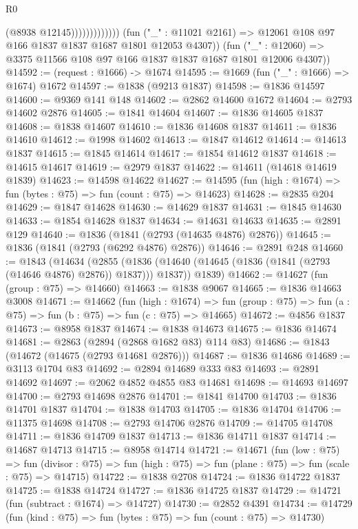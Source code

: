 \begin{lexlean}{R0}
\begin{coremodule}
                                (@8938 @12145)))))))))))))
        (fun ("_" : @11021 @2161) => @12061 @108 @97 @166 @1837 @1837 @1687 @1801 @12053 @4307))
      (fun ("_" : @12060) => @3375 @11566 @108 @97 @166 @1837 @1837 @1687 @1801 @12006 @4307))
@14592 := (request : @1666) -> @1674
@14595 := @1669 (fun ("_" : @1666) => @1674) @1672
@14597 := @1838 (@9213 @1837)
@14598 := @1836 @14597
@14600 := @9369 @141 @148
@14602 := @2862 @14600 @1672
@14604 := @2793 @14602 @2876
@14605 := @1841 @14604
@14607 := @1836 @14605 @1837
@14608 := @1838 @14607
@14610 := @1836 @14608 @1837
@14611 := @1836 @14610
@14612 := @1998 @14602
@14613 := @1847 @14612
@14614 := @14613 @1837
@14615 := @1845 @14614
@14617 := @1854 @14612 @1837
@14618 := @14615 @14617
@14619 := @2979 @1837
@14622 := @14611 (@14618 @14619 @1839)
@14623 := @14598 @14622
@14627 := @14595 (fun (high : @1674) => fun (bytes : @75) => fun (count : @75) => @14623)
@14628 := @2835 @204
@14629 := @1847 @14628
@14630 := @14629 @1837
@14631 := @1845 @14630
@14633 := @1854 @14628 @1837
@14634 := @14631 @14633
@14635 := @2891 @129
@14640 := @1836 (@1841 (@2793 (@14635 @4876) @2876))
@14645 := @1836 (@1841 (@2793 (@6292 @4876) @2876))
@14646 := @2891 @248
@14660 := @1843
    (@14634
      (@2855 (@1836 (@14640 (@14645 (@1836 (@1841 (@2793 (@14646 @4876) @2876)) @1837))) @1837))
      @1839)
@14662 := @14627 (fun (group : @75) => @14660)
@14663 := @1838 @9067
@14665 := @1836 @14663 @3008
@14671 := @14662
    (fun (high : @1674) =>
    fun (group : @75) => fun (a : @75) => fun (b : @75) => fun (c : @75) => @14665)
@14672 := @4856 @1837
@14673 := @8958 @1837
@14674 := @1838 @14673
@14675 := @1836 @14674
@14681 := @2863 (@2894 (@2868 @1682 @83) @114 @83)
@14686 := @1843 (@14672 (@14675 (@2793 @14681 @2876)))
@14687 := @1836 @14686
@14689 := @3113 @1704 @83
@14692 := @2894 @14689 @333 @83
@14693 := @2891 @14692
@14697 := @2062 @4852 @4855 @83 @14681
@14698 := @14693 @14697
@14700 := @2793 @14698 @2876
@14701 := @1841 @14700
@14703 := @1836 @14701 @1837
@14704 := @1838 @14703
@14705 := @1836 @14704
@14706 := @11375 @14698
@14708 := @2793 @14706 @2876
@14709 := @14705 @14708
@14711 := @1836 @14709 @1837
@14713 := @1836 @14711 @1837
@14714 := @14687 @14713
@14715 := @8958 @14714
@14721 := @14671
    (fun (low : @75) =>
    fun (divisor : @75) => fun (high : @75) => fun (plane : @75) => fun (scale : @75) => @14715)
@14722 := @1838 @2708
@14724 := @1836 @14722 @1837
@14725 := @1838 @14724
@14727 := @1836 @14725 @1837
@14729 := @14721 (fun (subtract : @1674) => @14727)
@14730 := @2852 @4391
@14734 := @14729 (fun (kind : @75) => fun (bytes : @75) => fun (count : @75) => @14730)

\end{coremodule}
\end{lexlean}
